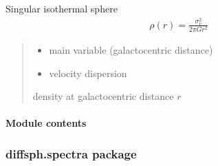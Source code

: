 \documentclass[letterpaper,10pt,english]{sphinxmanual}
\begin{document}
\begin{fulllineitems}
\label{\detokenize{diffsph.profiles:diffsph.profiles.templates.sis}}
\pysigstartsignatures
{}
\pysigstopsignatures
\sphinxAtStartPar
Singular isothermal sphere
\begin{equation*}
\begin{split}\rho(r) = \frac{\sigma_v^2}{2\pi G r^2}    \end{split}
\end{equation*}\begin{quote}\begin{description}
\begin{itemize}
\item {} 
\sphinxAtStartPar
{} \textendash{} main variable (galactocentric distance)

\item {} 
\sphinxAtStartPar
{} \textendash{} velocity dispersion

\end{itemize}

\sphinxAtStartPar
density at galactocentric distance \(r\)

\end{description}\end{quote}

\end{fulllineitems}



\paragraph{Module contents}
\label{\detokenize{diffsph.profiles:module-diffsph.profiles}}\label{\detokenize{diffsph.profiles:module-contents}}
\sphinxstepscope


\subsubsection{diffsph.spectra package}
\label{\detokenize{diffsph.spectra:diffsph-spectra-package}}\label{\detokenize{diffsph.spectra::doc}}
\end{document}
